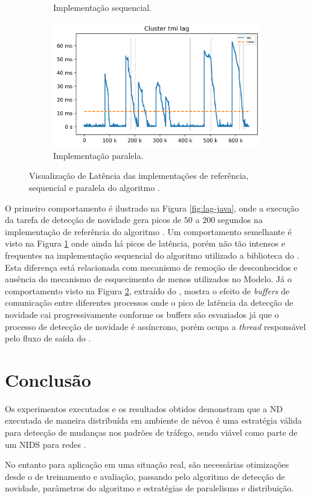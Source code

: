 \begin{figure}[h]
\begin{subfigure}{0.48\textwidth}
    \caption{Implementação sequencial.}
    \label{fig:lag-serial}
  \end{subfigure}
  \begin{subfigure}{0.48\textwidth}
    \centering
    \includegraphics[width=1\linewidth]{experiments/lag-mfog.png}
    \caption{Implementação paralela.}
    \label{fig:lag-mfog}
  \end{subfigure}
  \caption{Visualização de Latência das implementações de referência, sequencial
  e paralela do algoritmo \minas.}
  \label{fig:lag}
\end{figure}

O primeiro comportamento é ilustrado na Figura \ref{fig:lag-java}, onde a execução
da tarefa de detecção de novidade gera picos de $50$ a $200$ segundos
na implementação de referência do algoritmo \minas.
Um comportamento semelhante é visto na Figura \ref{fig:lag-serial} onde ainda há
picos de latência, porém não tão intensos e frequentes na implementação sequencial
do algoritmo \minas utilizado a biblioteca do \mfog.
Esta diferença está relacionada com mecanismo de remoção de desconhecidos e
ausência do mecanismo de esquecimento de \mclusters menos utilizados no Modelo.
Já o comportamento visto na Figura \ref{fig:lag-mfog}, extraído do \mfog, mostra o efeito de
\emph{buffers} de comunicação entre diferentes processos onde o pico de latência
da detecção de novidade cai progressivamente conforme os buffers são esvaziados
já que o processo de detecção de novidade é assíncrono, porém ocupa a \emph{thread}
responsável pelo fluxo de saída do \mfog.

\section{Conclusão}
\label{sec:exp-conclusao}

Os experimentos executados e os resultados obtidos demonstram que a \acf{ND}
executada de maneira distribuída em ambiente de névoa é uma estratégia
válida para detecção de mudanças nos padrões de tráfego, sendo viável como parte
de um \acf{NIDS} para redes \iot.

No entanto para aplicação em uma situação real, são necessárias otimizações
desde o \dataset de treinamento e avaliação, passando pelo algoritmo de detecção
de novidade, parâmetros do algoritmo e estratégias de paralelismo e
distribuição.
